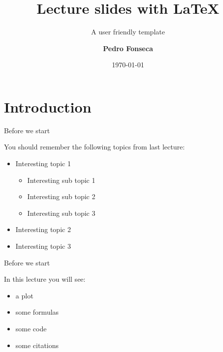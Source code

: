 


\title[Presentations with Latex]{Lecture slides with \LaTeX}
\subtitle{A user friendly template}
\author[Pedro Fonseca]{\textbf {Pedro Fonseca}}
\date{\today}






\section{Introduction}


\begin{frame}{Before we start}

You should remember the following topics from last lecture:

\begin{itemize}

\item Interesting topic 1

\begin{itemize}
\item Interesting sub topic 1
\item Interesting sub topic 2
\item Interesting sub topic 3
\end{itemize}

\item Interesting topic 2
\item Interesting topic 3

\end{itemize}

\end{frame}


\begin{frame}{Before we start}

In this lecture you will see:

\begin{itemize}

\item a plot
\item some formulas
\item some code
\item some citations

\end{itemize}

\end{frame}

